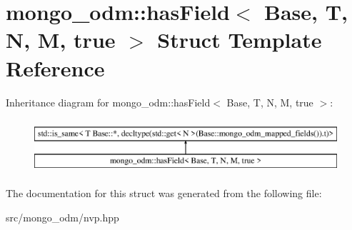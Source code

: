 \hypertarget{structmongo__odm_1_1hasField_3_01Base_00_01T_00_01N_00_01M_00_01true_01_4}{}\section{mongo\+\_\+odm\+:\+:has\+Field$<$ Base, T, N, M, true $>$ Struct Template Reference}
\label{structmongo__odm_1_1hasField_3_01Base_00_01T_00_01N_00_01M_00_01true_01_4}
Inheritance diagram for mongo\+\_\+odm\+:\+:has\+Field$<$ Base, T, N, M, true $>$\+:\begin{figure}[H]
\begin{center}
\leavevmode
\includegraphics[height=2.000000cm]{structmongo__odm_1_1hasField_3_01Base_00_01T_00_01N_00_01M_00_01true_01_4}
\end{center}
\end{figure}


The documentation for this struct was generated from the following file\+:\begin{DoxyCompactItemize}
\item 
src/mongo\+\_\+odm/nvp.\+hpp\end{DoxyCompactItemize}
